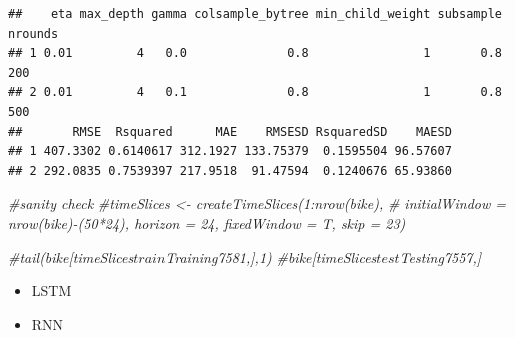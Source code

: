\documentclass[
]{article}
\newenvironment{Shaded}{\begin{snugshade}}{\end{snugshade}}
\newcommand{\CommentTok}[1]{\textcolor[rgb]{0.56,0.35,0.01}{\textit{#1}}}
\newcommand{\NormalTok}[1]{#1}
\newcommand{\SpecialCharTok}[1]{\textcolor[rgb]{0.00,0.00,0.00}{#1}}
\providecommand{\tightlist}{%
  \setlength{\itemsep}{0pt}\setlength{\parskip}{0pt}}
\begin{document}
\begin{Shaded}
\end{Shaded}

\begin{verbatim}
##    eta max_depth gamma colsample_bytree min_child_weight subsample nrounds
## 1 0.01         4   0.0              0.8                1       0.8     200
## 2 0.01         4   0.1              0.8                1       0.8     500
##       RMSE  Rsquared      MAE    RMSESD RsquaredSD    MAESD
## 1 407.3302 0.6140617 312.1927 133.75379  0.1595504 96.57607
## 2 292.0835 0.7539397 217.9518  91.47594  0.1240676 65.93860
\end{verbatim}

\begin{Shaded}
\begin{Highlighting}[]
\CommentTok{\#sanity check}
\CommentTok{\#timeSlices \textless{}{-} createTimeSlices(1:nrow(bike), }
\CommentTok{\#                   initialWindow = nrow(bike){-}(50*24), horizon = 24, fixedWindow = T, skip = 23)}

\CommentTok{\#tail(bike[timeSlices$train$Training7581,],1)}
\CommentTok{\#bike[timeSlices$test$Testing7557,]}
\end{Highlighting}
\end{Shaded}

\begin{itemize}
\tightlist
\item
  LSTM
\item
  RNN
\end{itemize}
\end{document}
